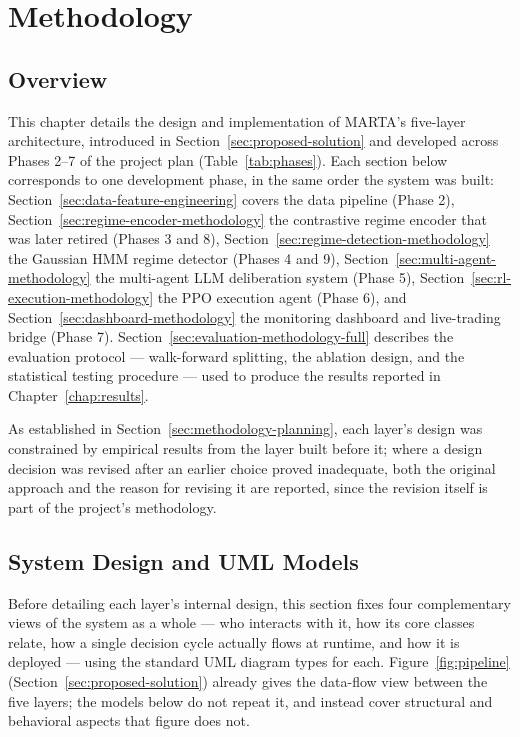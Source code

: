 \chapter{Methodology}
\label{chap:methodology}

\section{Overview}
\label{sec:methodology-overview}

This chapter details the design and implementation of MARTA's five-layer architecture, introduced in Section~\ref{sec:proposed-solution} and developed across Phases 2--7 of the project plan (Table~\ref{tab:phases}). Each section below corresponds to one development phase, in the same order the system was built: Section~\ref{sec:data-feature-engineering} covers the data pipeline (Phase 2), Section~\ref{sec:regime-encoder-methodology} the contrastive regime encoder that was later retired (Phases 3 and 8), Section~\ref{sec:regime-detection-methodology} the Gaussian HMM regime detector (Phases 4 and 9), Section~\ref{sec:multi-agent-methodology} the multi-agent LLM deliberation system (Phase 5), Section~\ref{sec:rl-execution-methodology} the PPO execution agent (Phase 6), and Section~\ref{sec:dashboard-methodology} the monitoring dashboard and live-trading bridge (Phase 7). Section~\ref{sec:evaluation-methodology-full} describes the evaluation protocol --- walk-forward splitting, the ablation design, and the statistical testing procedure --- used to produce the results reported in Chapter~\ref{chap:results}.

As established in Section~\ref{sec:methodology-planning}, each layer's design was constrained by empirical results from the layer built before it; where a design decision was revised after an earlier choice proved inadequate, both the original approach and the reason for revising it are reported, since the revision itself is part of the project's methodology.

\section{System Design and UML Models}
\label{sec:system-design-uml}

Before detailing each layer's internal design, this section fixes four complementary views of the system as a whole --- who interacts with it, how its core classes relate, how a single decision cycle actually flows at runtime, and how it is deployed --- using the standard UML diagram types for each. Figure~\ref{fig:pipeline} (Section~\ref{sec:proposed-solution}) already gives the data-flow view between the five layers; the models below do not repeat it, and instead cover structural and behavioral aspects that figure does not.

